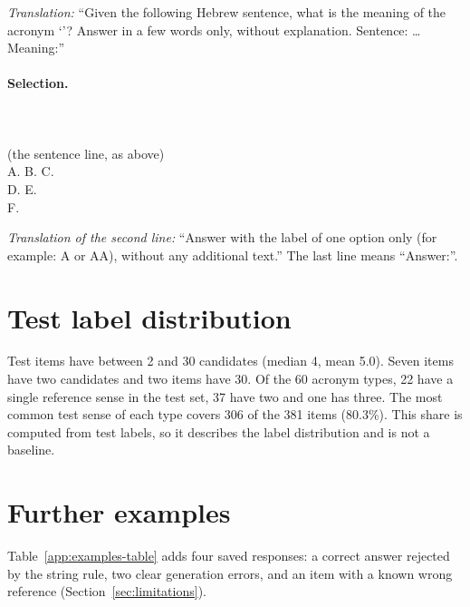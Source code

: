 \noindent\emph{Translation:} ``Given the following Hebrew sentence, what is the meaning of the acronym `'? Answer in a few words only, without explanation. Sentence: \ldots{} Meaning:''

\paragraph{Selection.}
\\
\\
(the sentence line, as above)\\
A.  \quad B.  \quad C. \\
D.  \quad E. \\
F. \\

\noindent\emph{Translation of the second line:} ``Answer with the label of one option only (for example: A or AA), without any additional text.'' The last line means ``Answer:''.

\section{Test label distribution}
\label{app:labels}
Test items have between 2 and 30 candidates (median 4, mean 5.0). Seven items have two candidates and two items have 30. Of the 60 acronym types, 22 have a single reference sense in the test set, 37 have two and one has three. The most common test sense of each type covers 306 of the 381 items (80.3\%). This share is computed from test labels, so it describes the label distribution and is not a baseline.

\section{Further examples}
\label{app:examples}
Table~\ref{app:examples-table} adds four saved responses: a correct answer rejected by the string rule, two clear generation errors, and an item with a known wrong reference (Section~\ref{sec:limitations}).

